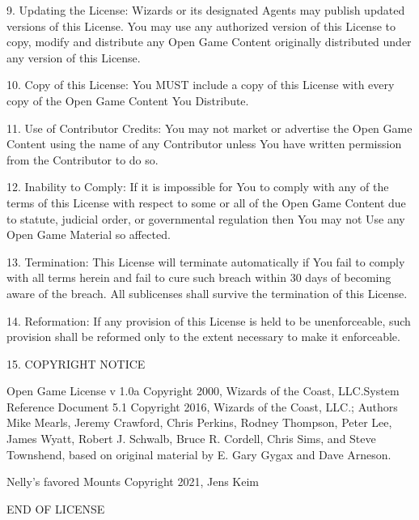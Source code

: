 \documentclass[letterpaper,twocolumn,openany,nodeprecatedcode]{dndbook}
\begin{document}
9. Updating the License: Wizards or its designated Agents may publish updated versions of this License. You may use any authorized version of this License to copy, modify and distribute any Open Game Content originally distributed under any version of this License.

10. Copy of this License: You MUST include a copy of this License with every copy of the Open Game Content You Distribute.

11. Use of Contributor Credits: You may not market or advertise the Open Game Content using the name of any Contributor unless You have written permission from the Contributor to do so.

12. Inability to Comply: If it is impossible for You to comply with any of the terms of this License with respect to some or all of the Open Game Content due to statute, judicial order, or governmental regulation then You may not Use any Open Game Material so affected.

13. Termination: This License will terminate automatically if You fail to comply with all terms herein and fail to cure such breach within 30 days of becoming aware of the breach. All sublicenses shall survive the termination of this License.

14. Reformation: If any provision of this License is held to be unenforceable, such provision shall be reformed only to the extent necessary to make it enforceable.

15. COPYRIGHT NOTICE

    Open Game License v 1.0a Copyright 2000, Wizards of the Coast, LLC.System Reference Document 5.1 Copyright 2016, Wizards of the Coast, LLC.; Authors Mike Mearls, Jeremy Crawford, Chris Perkins, Rodney Thompson, Peter Lee, James Wyatt, Robert J. Schwalb, Bruce R. Cordell, Chris Sims, and Steve Townshend, based on original material by E. Gary Gygax and Dave Arneson.

    Nelly's favored Mounts Copyright 2021, Jens Keim

END OF LICENSE
\end{document}
